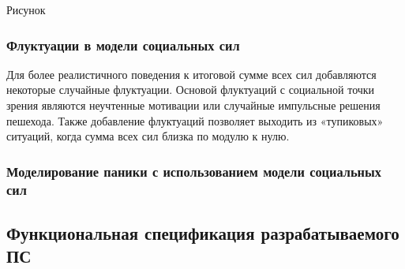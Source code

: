 Рисунок

\subsubsection{Флуктуации в модели социальных сил}
\label{sec:model:sf:fluctuation}

Для более реалистичного поведения к итоговой сумме всех сил добавляются некоторые случайные флуктуации.
Основой флуктуаций с социальной точки зрения являются неучтенные мотивации или случайные импульсные решения пешехода.
Также добавление флуктуаций позволяет выходить из «тупиковых» ситуаций, когда сумма всех сил близка по модулю к нулю.

\subsubsection{Моделирование паники с использованием модели социальных сил}
\label{sec:model:sf:panic}

\subsection{Функциональная спецификация разрабатываемого ПС}
\label{sec:model:func_spec}

